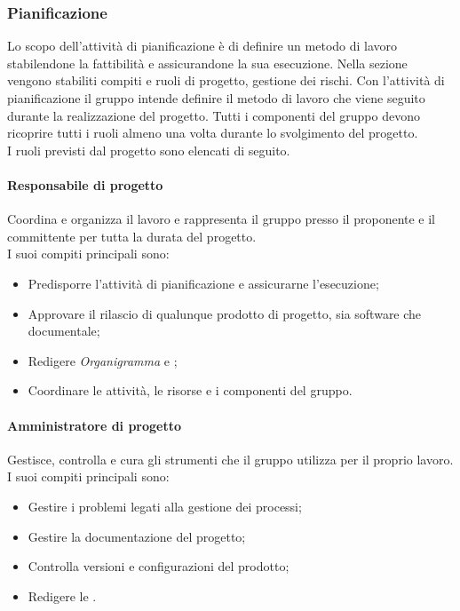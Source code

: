 \subsubsection{Pianificazione}
Lo scopo dell'attività di pianificazione è di definire un metodo di lavoro stabilendone la fattibilità e assicurandone la sua esecuzione.
Nella sezione vengono stabiliti compiti e ruoli di progetto, gestione dei rischi. 
Con l'attività di pianificazione il gruppo intende definire il metodo di lavoro che viene seguito durante la realizzazione del progetto.
Tutti i componenti del gruppo devono ricoprire tutti i ruoli almeno una volta durante lo svolgimento del progetto. \\
I ruoli previsti dal progetto sono elencati di seguito.
\paragraph*{Responsabile di progetto}
Coordina e organizza il lavoro e rappresenta il gruppo presso il proponente e il committente per tutta la durata del progetto. \\
I suoi compiti principali sono:
\begin{itemize}
	\item Predisporre l'attività di pianificazione e assicurarne l'esecuzione;
	\item Approvare il rilascio di qualunque prodotto di progetto, sia software che documentale;
	\item Redigere \textit{Organigramma} e \textit{\PdP};
	\item Coordinare le attività, le risorse e i componenti del gruppo.
\end{itemize}

\paragraph*{Amministratore di progetto}
Gestisce, controlla e cura gli strumenti che il gruppo utilizza per il proprio lavoro.\\
I suoi compiti principali sono:
\begin{itemize}
	\item Gestire i problemi legati alla gestione dei processi;
	\item Gestire la documentazione del progetto;
	\item Controlla versioni e configurazioni del prodotto;
	\item Redigere le \textit{\NdP}.
\end{itemize}

